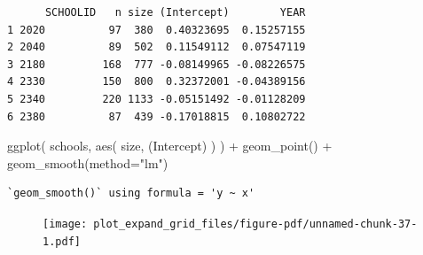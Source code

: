 \documentclass[
  letterpaper,
  DIV=11,
  numbers=noendperiod]{scrreprt}
\newenvironment{Shaded}{\begin{snugshade}}{\end{snugshade}}
\newcommand{\AttributeTok}[1]{\textcolor[rgb]{0.49,0.56,0.16}{#1}}
\newcommand{\DecValTok}[1]{\textcolor[rgb]{0.25,0.63,0.44}{#1}}
\newcommand{\FunctionTok}[1]{\textcolor[rgb]{0.02,0.16,0.49}{#1}}
\newcommand{\NormalTok}[1]{\textcolor[rgb]{0.00,0.44,0.13}{#1}}
\newcommand{\OtherTok}[1]{\textcolor[rgb]{0.00,0.44,0.13}{#1}}
\newcommand{\SpecialCharTok}[1]{\textcolor[rgb]{0.25,0.44,0.63}{#1}}
\newcommand{\StringTok}[1]{\textcolor[rgb]{0.25,0.44,0.63}{#1}}
\begin{document}
\begin{Shaded}
\end{Shaded}

\begin{verbatim}
      SCHOOLID   n size (Intercept)        YEAR
1 2020          97  380  0.40323695  0.15257155
2 2040          89  502  0.11549112  0.07547119
3 2180         168  777 -0.08149965 -0.08226575
4 2330         150  800  0.32372001 -0.04389156
5 2340         220 1133 -0.05151492 -0.01128209
6 2380          87  439 -0.17018815  0.10802722
\end{verbatim}

\begin{Shaded}
\begin{Highlighting}[]
\FunctionTok{ggplot}\NormalTok{( schools, }\FunctionTok{aes}\NormalTok{( size, }\StringTok{\textasciigrave{}}\AttributeTok{(Intercept)}\StringTok{\textasciigrave{}}\NormalTok{ ) ) }\SpecialCharTok{+}
  \FunctionTok{geom\_point}\NormalTok{() }\SpecialCharTok{+}
  \FunctionTok{geom\_smooth}\NormalTok{(}\AttributeTok{method=}\StringTok{"lm"}\NormalTok{)}
\end{Highlighting}
\end{Shaded}

\begin{verbatim}
`geom_smooth()` using formula = 'y ~ x'
\end{verbatim}

\begin{figure}[H]

{\centering \texttt{[image: plot\_expand\_grid\_files/figure-pdf/unnamed-chunk-37-1.pdf]}

}

\end{figure}
\end{document}
